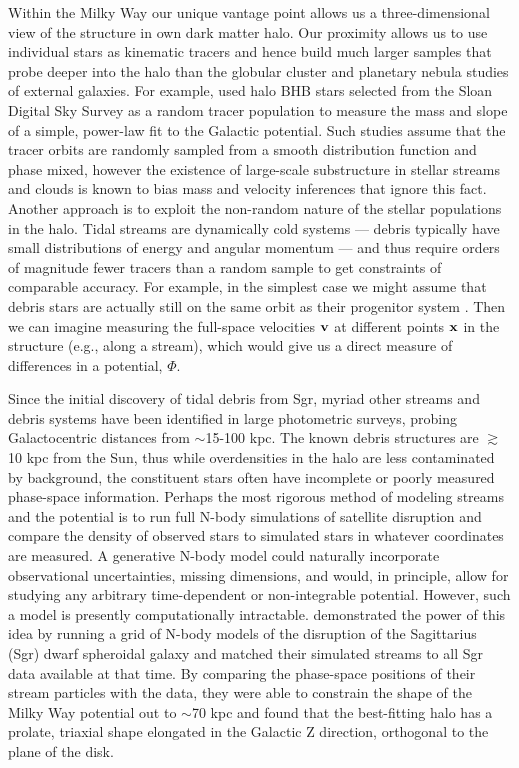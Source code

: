 \documentclass[letterpaper,12pt,preprint]{aastex}
\begin{document}
Within the Milky Way our unique vantage point allows us a three-dimensional view of the structure in own dark matter halo. Our proximity allows us to use individual stars as kinematic tracers and hence build much larger samples that probe deeper into the halo than the globular cluster and planetary nebula studies of external galaxies. For example, \cite{deason12a} used halo BHB stars selected from the Sloan Digital Sky Survey \cite[SDSS;][]{york00} as a random tracer population to measure the mass and slope of a simple, power-law fit to the Galactic potential. Such studies assume that the tracer orbits are randomly sampled from a smooth distribution function and phase mixed, however the existence of large-scale substructure in stellar streams and clouds is known to bias mass and velocity inferences that ignore this fact. Another approach is to exploit the non-random nature of the stellar populations in the halo. Tidal streams are dynamically cold systems --- debris typically have small distributions of energy and angular momentum --- and thus require orders of magnitude fewer tracers than a random sample to get constraints of comparable accuracy. For example, in the simplest case we might assume that debris stars are actually still on the same orbit as their progenitor system \citep[a \emph{wrong} assumption, see e.g.,][]{eyre11}. Then we can imagine measuring the full-space velocities ${\bf v}$ at different points ${\bf x}$ in the structure (e.g., along a stream), which would give us a direct measure of differences in a potential, $\Phi$. 

Since the initial discovery of tidal debris from Sgr, myriad other streams and debris systems have been identified in large photometric surveys, probing Galactocentric distances from $\sim$15-100 kpc. The known debris structures are $\gtrsim$10 kpc from the Sun, thus while overdensities in the halo are less contaminated by background, the constituent stars often have incomplete or poorly measured phase-space information. Perhaps the most rigorous method of modeling streams and the potential is to run full N-body simulations of satellite disruption and compare the density of observed stars to simulated stars in whatever coordinates are measured. A generative N-body model could naturally incorporate observational uncertainties, missing dimensions, and would, in principle, allow for studying any arbitrary time-dependent or non-integrable potential. However, such a model is presently computationally intractable. \cite{law10} demonstrated the power of this idea by running a grid of N-body models of the disruption of the Sagittarius (Sgr) dwarf spheroidal galaxy and matched their simulated streams to all Sgr data available at that time. By comparing the phase-space positions of their stream particles with the data, they were able to constrain the shape of the Milky Way potential out to $\sim$70 kpc and found that the best-fitting halo has a prolate, triaxial shape elongated in the Galactic Z direction, orthogonal to the plane of the disk. 
\end{document}
